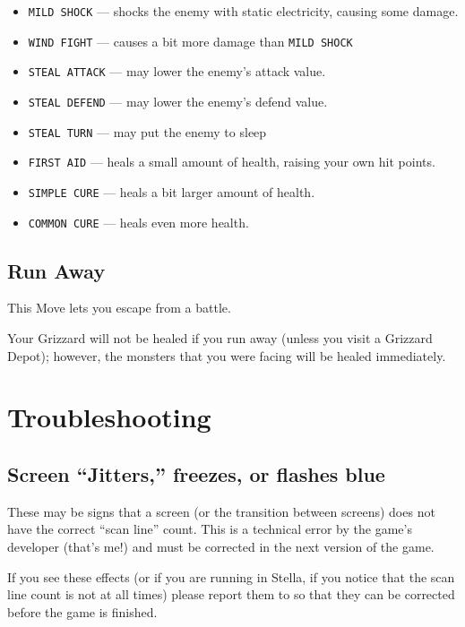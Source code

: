 \documentclass[10pt,twocolumn,openany,article]{memoir}
\begin{document}
\begin{description}
\begin{itemize}
\item \texttt{MILD SHOCK} --- shocks  the enemy with static electricity,
  causing some damage.
\item \texttt{WIND FIGHT} --- causes a bit more damage than \texttt{MILD SHOCK}
\item \texttt{STEAL ATTACK} --- may lower the enemy's attack value.
\item \texttt{STEAL DEFEND} --- may lower the enemy's defend value.
\item \texttt{STEAL TURN} --- may put the enemy to sleep
\item \texttt{FIRST  AID} ---  heals a small  amount of  health, raising
  your own hit points.
\item \texttt{SIMPLE CURE} --- heals a bit larger amount of health.
\item \texttt{COMMON CURE} --- heals even more health.
\end{itemize}

\fi

\section{Run Away}

This Move lets you escape from a battle.

Your  Grizzard will  not be  healed if  you run  away (unless  you visit
a  Grizzard Depot);  however, the  monsters  that you  were facing  will
be healed immediately.



\chapter{Troubleshooting}

\ifdefined\DEMO

\section{Screen ``Jitters,'' freezes, or flashes blue}

These may  be signs that  a screen  (or the transition  between screens)
does not have the correct ``scan line'' count. This is a technical error
by the game's  developer (that's me!) and must be  corrected in the next
version of the game.

If you see these effects (or if you are running in Stella, if you notice
that the scan  line count is not \ifdefined{}   \fi at
all         times)         please         report         them         to
 so  that they
can be corrected before the game is finished.


\end{description}
\end{document}
